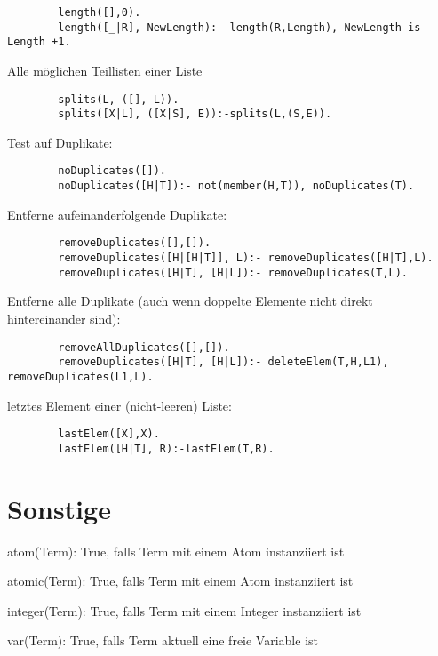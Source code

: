 \begin{compactitem}
		\begin{lstlisting}
		length([],0).
		length([_|R], NewLength):- length(R,Length), NewLength is Length +1.
		\end{lstlisting}	
	\item Alle möglichen Teillisten einer Liste 
		\begin{lstlisting}
		splits(L, ([], L)).
		splits([X|L], ([X|S], E)):-splits(L,(S,E)).
		\end{lstlisting}
	\item Test auf Duplikate:
		\begin{lstlisting}
		noDuplicates([]).
		noDuplicates([H|T]):- not(member(H,T)), noDuplicates(T).
		\end{lstlisting}
	\item Entferne aufeinanderfolgende Duplikate:
		\begin{lstlisting}
		removeDuplicates([],[]).
		removeDuplicates([H|[H|T]], L):- removeDuplicates([H|T],L).
		removeDuplicates([H|T], [H|L]):- removeDuplicates(T,L).
		\end{lstlisting}
	\item Entferne alle Duplikate (auch wenn doppelte Elemente nicht direkt hintereinander sind):
		\begin{lstlisting}
		removeAllDuplicates([],[]).
		removeDuplicates([H|T], [H|L]):- deleteElem(T,H,L1), removeDuplicates(L1,L).
		\end{lstlisting}
	\item letztes Element einer (nicht-leeren) Liste:
		\begin{lstlisting}
		lastElem([X],X).
		lastElem([H|T], R):-lastElem(T,R).
		\end{lstlisting}
\end{compactitem}

\section{Sonstige}
\begin{compactitem}
	\item atom(Term): True, falls Term mit einem Atom instanziiert ist 
	\item atomic(Term): True, falls Term mit einem Atom instanziiert ist 
	\item integer(Term): True, falls Term mit einem Integer instanziiert ist
	\item var(Term): True, falls Term aktuell eine freie Variable ist
\end{compactitem}